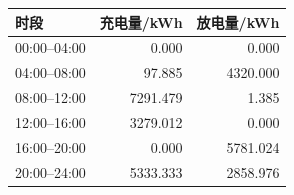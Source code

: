\begin{tabular}{lrr}
\toprule
时段 & 充电量/kWh & 放电量/kWh \\
\midrule
00:00--04:00 & 0.000 & 0.000 \\
04:00--08:00 & 97.885 & 4320.000 \\
08:00--12:00 & 7291.479 & 1.385 \\
12:00--16:00 & 3279.012 & 0.000 \\
16:00--20:00 & 0.000 & 5781.024 \\
20:00--24:00 & 5333.333 & 2858.976 \\
\bottomrule
\end{tabular}
